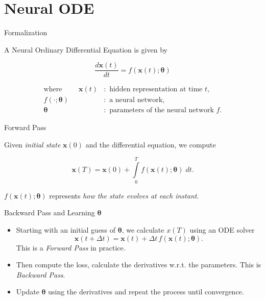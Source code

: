 \section{Neural ODE}


\begin{frame}{Formalization}

A Neural Ordinary Differential Equation is given by

$$\dfrac{d \boldsymbol{x}(t)}{dt} = f(\boldsymbol{x}(t); \boldsymbol{\theta})$$

\begin{align*}
\text{where } \qquad \boldsymbol{x}(t) &: \text{ hidden representation at time }t, \\[0.2em]
f(\cdot; \boldsymbol{\theta}) &: \text{ a neural network}, \\[0.2em]
\boldsymbol{\theta} &: \text{ parameters of the neural network } f.
\end{align*}
\end{frame}



\begin{frame}{Forward Pass}

Given \textit{initial state} $\boldsymbol{x}(0)$ and the differential equation, we compute

$$\boldsymbol{x}(T) = \boldsymbol{x}(0) + \int \limits_0^T f(\boldsymbol{x}(t); \boldsymbol{\theta}) \; dt.$$

$f(\boldsymbol{x}(t); \boldsymbol{\theta})$ represents \textit{how the state evolves at each instant}.
\end{frame}



\begin{frame}{Backward Pass and Learning $\boldsymbol{\theta}$}

\begin{itemize}
\item<1-> Starting with an initial guess of $\boldsymbol{\theta}$, we calculate $x(T)$ using an ODE solver $$\boldsymbol{x}(t+\Delta t) = \boldsymbol{x}(t)+\Delta t\, f(\boldsymbol{x}(t); \boldsymbol{\theta}).$$ This is a \textit{Forward Pass} in practice.

\item<2-> Then compute the loss, calculate the derivatives w.r.t. the parameters. This is \textit{Backward Pass}.

\item<3-> Update $\boldsymbol{\theta}$ using the derivatives and repeat the process until convergence.
\end{itemize}
\end{frame}